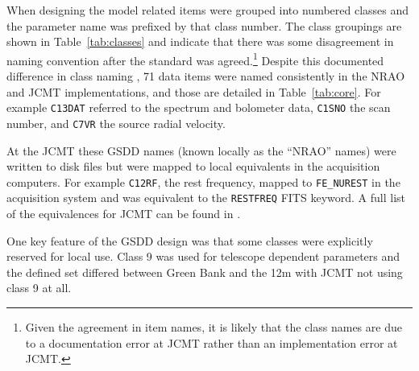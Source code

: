 \documentclass[final,authoryear,5p,times,twocolumn]{elsarticle}
\begin{document}
When designing the model related items were grouped into numbered
classes and the parameter name was prefixed by that class number. The
class groupings are shown in Table~\ref{tab:classes} and indicate that
there was some disagreement in naming convention after the standard
was agreed.\footnote{Given the agreement in item names, it is likely
  that the class names are due to a documentation error at JCMT rather
  than an implementation error at JCMT.} Despite this documented
difference in class naming \citep{mtdn85}, 71 data items were named
consistently in the NRAO and JCMT implementations, and those are
detailed in Table~\ref{tab:core}. For example \texttt{C13DAT} referred
to the spectrum and bolometer data, \texttt{C1SNO} the scan number,
and \texttt{C7VR} the source radial velocity.

At the JCMT these GSDD names (known locally as the ``NRAO'' names)
were written to disk files but were mapped to local equivalents in
the acquisition computers. For example \texttt{C12RF}, the rest
frequency, mapped to \texttt{FE\_NUREST} in the acquisition system and
was equivalent to the \texttt{RESTFREQ} FITS keyword. A full list of
the equivalences for JCMT can be found in \citet{SUN229}.

One key feature of the GSDD design was that some classes were
explicitly reserved for local use. Class 9 was used for telescope
dependent parameters and the defined set differed between Green Bank
and the 12m with JCMT not using class 9 at all.
\end{document}
